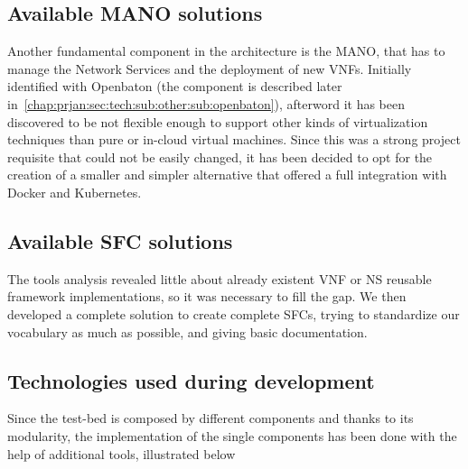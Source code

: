 

\subsection{Available MANO solutions}

Another fundamental component in the architecture is the MANO, that has to
manage the Network Services and the deployment of new VNFs. Initially identified
with Openbaton (the component is described later
in~\ref{chap:prjan:sec:tech:sub:other:sub:openbaton}), afterword it has been
discovered to be not flexible enough to support other kinds of virtualization
techniques than pure or in-cloud virtual machines. Since this was a strong
project requisite that could not be easily changed, it has been decided to opt
for the creation of a smaller and simpler alternative that offered a full
integration with Docker and Kubernetes.

\subsection{Available SFC solutions}
The tools analysis revealed little about already existent VNF or NS reusable
framework implementations, so it was necessary to fill the gap. We then
developed a complete solution to create complete SFCs, trying to standardize
our vocabulary as much as possible, and giving basic documentation.

\subsection{Technologies used during development}

Since the test-bed is composed by different components and thanks to its 
modularity, the implementation of the single components has been done with the 
help of additional tools, illustrated below

